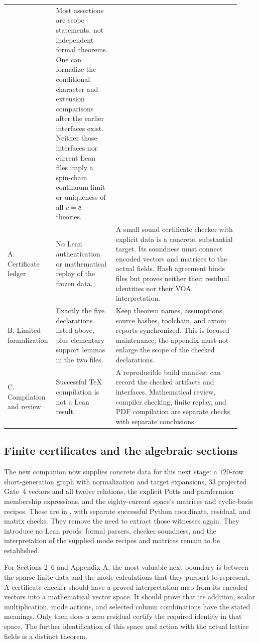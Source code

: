 \begin{longtable}{@{}P{0.15\linewidth}P{0.25\linewidth}P{0.52\linewidth}@{}}
& Most assertions are scope statements, not independent formal
theorems. One can formalize the conditional character and extension
comparisons after the earlier interfaces exist. Neither those
interfaces nor current Lean files imply a spin-chain continuum limit
or uniqueness of all $c=8$ theories.\\
A. Certificate ledger
& No Lean authentication or mathematical replay of the frozen data.
& A small sound certificate checker with explicit data is a concrete,
substantial target. Its soundness must connect encoded vectors and
matrices to the actual fields. Hash agreement binds files but proves
neither their residual identities nor their VOA interpretation.\\
B. Limited formalization
& Exactly the five declarations listed above, plus elementary support
lemmas in the two files.
& Keep theorem names, assumptions, source hashes, toolchain, and axiom
reports synchronized. This is focused maintenance; the appendix must
not enlarge the scope of the checked declarations.\\
C. Compilation and review
& Successful TeX compilation is not a Lean result.
& A reproducible build manifest can record the checked artifacts and
interfaces. Mathematical review, compiler checking, finite replay,
and PDF compilation are separate checks with separate conclusions.\\
\end{longtable}

\subsection{Finite certificates and the algebraic sections}

The new companion now supplies concrete data for this next stage:
a $120$-row short-generation graph with normalization and target
expansions, $33$ projected Gate~4 vectors and all twelve relations,
the explicit Potts and parafermion membership expressions, and the
eighty-current space's matrices and cyclic-basis recipes.  These are
in , with separate successful
Python coordinate, residual, and matrix checks.  They remove the
need to extract those witnesses again.  They introduce no Lean
proofs: formal parsers, checker soundness, and the interpretation
of the supplied mode recipes and matrices remain to be established.

For Sections 2--6 and Appendix A, the most valuable next boundary is
between the sparse finite data and the mode calculations that they
purport to represent. A certificate checker should have a proved
interpretation map from its encoded vectors into a mathematical vector
space. It should prove that its addition, scalar multiplication, mode
actions, and selected column combinations have the stated meanings.
Only then does a zero residual certify the required identity in that
space. The further identification of this space and action with the
actual lattice fields is a distinct theorem.

